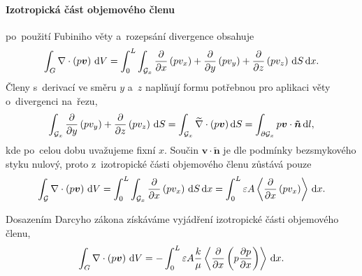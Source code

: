 \paragraph{Izotropická část objemového členu} po~použití Fubiniho věty a~rozepsání divergence obsahuje
\begin{equation}
    \int_G \nabla\cdot\left(p \bm{v}\right) \,\mathrm{d}{V}=
    \int_0^L\int_{\mathcal{G}_x}\frac{\partial }{\partial x}\left(pv_x\right)+\frac{\partial }{\partial y}\left(p v_y\right)+\frac{\partial }{\partial z} \left(p v_z\right)\,\mathrm{d}{S}\,\mathrm{d}{x}.
\end{equation}
Členy s~derivací ve směru $y$ a~$z$ naplňují formu potřebnou pro aplikaci věty o~divergenci na~řezu,
\begin{equation}
    \int_{\mathcal{G}_x}\frac{\partial }{\partial y}\left(p v_y\right)+\frac{\partial }{\partial z} \left(p v_z\right)\,\mathrm{d}{S}=
    \int_{\mathcal{G}_x}\widetilde{\nabla}\cdot(p\bm{v})\,\mathrm{d}{S}=
    \int_{\partial\mathcal{G}_x}p\bm{v}\cdot\bm{\tilde{n}}\,\mathrm{d}{l},
\end{equation}
kde po~celou dobu uvažujeme fixní $x$. Součin $\bm{v}\cdot\bm{\tilde{n}}$ je dle podmínky bezsmyko\-vého styku nulový, proto z~izotropické části objemového členu zůstává pouze 
\begin{equation}
    \int_{\mathcal{G}} \nabla\cdot\left(p \bm{v}\right) \,\mathrm{d}{V}
    =\int_0^L\int_{\mathcal{G}_x}\frac{\partial }{\partial x}\left(p v_x\right)\,\mathrm{d}{S}\,\mathrm{d}{x}
    =\int_0^L\varepsilon A \left\langle\frac{\partial }{\partial x}\left(p v_x\right)\right\rangle \,\mathrm{d}{x}.
\end{equation}

Dosazením Darcyho zákona získáváme vyjádření izotropické části objemového členu,
\begin{equation}\label{eq:isotropic_mean}
    \int_G \nabla\cdot\left(p \bm{v}\right) \,\mathrm{d}{V}=-\int_0^L\varepsilon A \frac{k}{\mu}\left\langle \frac{\partial }{\partial x}\left(p\frac{\partial p}{\partial x}\right)\right\rangle \,\mathrm{d}{x}.
\end{equation}

